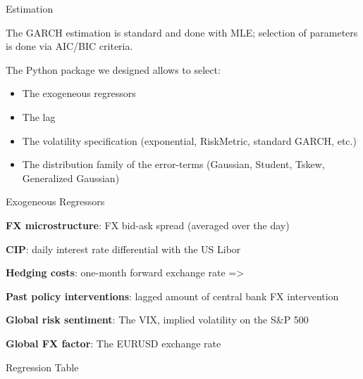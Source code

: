 \documentclass{beamer}
\newenvironment{largeitemize}{\itemize\addtolength{\itemsep}{10pt}}{\enditemize}
\newenvironment{largeenumerate}{\enumerate\addtolength{\itemsep}{10pt}}{\endenumerate}
\begin{document}
\begin{frame}{Estimation}
\begin{largeitemize}
  \item The GARCH estimation is standard and done with MLE; selection of parameters
    is done via AIC/BIC criteria.
    
  \item The Python package we designed allows to select:

    \begin{itemize}
    \item The exogeneous regressors
    \item The lag
    \item The volatility specification (exponential, RiskMetric, standard GARCH,
      etc.)
    \item The distribution family of the error-terms (Gaussian,
    Student, Tskew, Generalized Gaussian)  
      \end{itemize}    
\end{largeitemize}
\end{frame}

\begin{frame}{Exogeneous Regressors}
  \begin{largeenumerate}
  \item[] \textbf{FX microstructure}: FX bid-ask spread (averaged over the day)
  \item[] \textbf{CIP}: daily interest rate differential with the US Libor 
  \item[] \textbf{Hedging costs}: one-month forward exchange rate =>  
  \item[] \textbf{Past policy interventions}: lagged amount of central bank FX intervention 
  \item[] \textbf{Global risk sentiment}: The VIX, implied volatility on the S\&P 500 
  \item[] \textbf{Global FX factor}: The EURUSD exchange rate
  \end{largeenumerate}
 
\end{frame}


\begin{frame}{Regression Table}
\setlength\tabcolsep{2pt}  %
\tiny  %

\normalsize
\end{frame}
\end{document}
